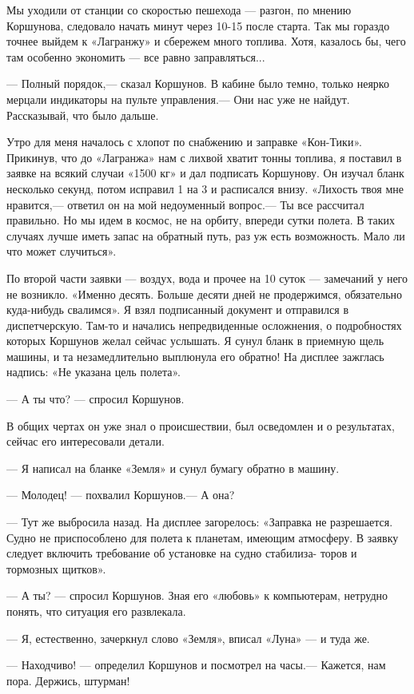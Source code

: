 \documentclass[11pt,a4paper,oneside]{article}
\begin{document}
Мы уходили от станции со скоростью пешехода — разгон, по мнению Коршунова, следовало начать минут через 10-15 после старта. Так мы гораздо точнее выйдем к «Лагранжу» и сбережем много топлива. Хотя, казалось бы, чего там особенно экономить — все равно заправляться...

— Полный порядок,— сказал Коршунов. В кабине было темно, только  неярко мерцали индикаторы на пульте управления.— Они нас уже не найдут. Рассказывай, что было дальше.

Утро для меня началось с хлопот по снабжению и заправке «Кон-Тики». Прикинув, что до «Лагранжа» нам с лихвой хватит тонны топлива, я поставил в заявке на всякий случаи «1500 кг» и дал подписать Коршунову. Он изучал бланк несколько секунд, потом исправил 1 на 3 и расписался внизу. «Лихость твоя мне нравится,— ответил он на мой недоуменный вопрос.— Ты все рассчитал правильно. Но мы идем в космос, не на орбиту, впереди сутки полета. В таких случаях лучше иметь запас на обратный путь, раз уж есть возможность. Мало ли что может случиться».

По второй части заявки — воздух, вода и прочее на 10 суток — замечаний у него не возникло. «Именно десять. Больше десяти дней не продержимся, обязательно куда-нибудь свалимся». Я взял подписанный документ и отправился в диспетчерскую. Там-то и начались непредвиденные осложнения, о подробностях которых Коршунов желал сейчас услышать. Я сунул бланк в приемную щель машины, и та незамедлительно выплюнула его обратно! На дисплее зажглась надпись: «Не указана цель полета».

— А ты что? — спросил Коршунов.

В общих чертах он уже знал о происшествии, был осведомлен и о результатах, сейчас его интересовали детали.

— Я написал на бланке «Земля» и сунул бумагу обратно в машину.

— Молодец! — похвалил Коршунов.— А она?

— Тут же выбросила назад. На дисплее загорелось: «Заправка не разрешается. Судно не приспособлено для полета к планетам, имеющим атмосферу. В заявку следует включить требование об установке на судно стабилиза- торов и тормозных щитков».

— А ты? — спросил Коршунов. Зная его «любовь» к компьютерам, нетрудно понять, что ситуация его развлекала.

— Я, естественно, зачеркнул слово «Земля», вписал «Луна» — и туда же.

— Находчиво! — определил Коршунов и посмотрел на часы.— Кажется, нам пора. Держись, штурман!
\end{document}
